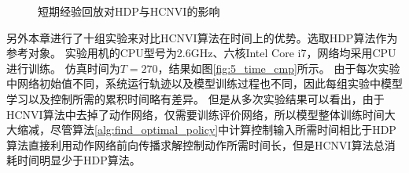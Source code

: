\begin{figure}[htb]
\centering 
    \caption{短期经验回放对HDP与HCNVI的影响 }
    \label{fig:stable_replay_cmp}
\end{figure}

另外本章进行了十组实验来对比HCNVI算法在时间上的优势。选取HDP算法作为参考对象。
实验用机的CPU型号为2.6GHz、六核Intel Core i7，网络均采用CPU进行训练。
仿真时间为$T=270$，结果如图\ref{fig:5_time_cmp}所示。
由于每次实验中网络初始值不同，系统运行轨迹以及模型训练过程也不同，因此每组实验中模型学习以及控制所需的累积时间略有差异。
但是从多次实验结果可以看出，由于
HCNVI算法中去掉了动作网络，仅需要训练评价网络，所以模型整体训练时间大大缩减，尽管算法\ref{alg:find_optimal_policy}中计算控制输入所需时间相比于HDP算法直接利用动作网络前向传播求解控制动作所需时间长，但是HCNVI算法总消耗时间明显少于HDP算法。

